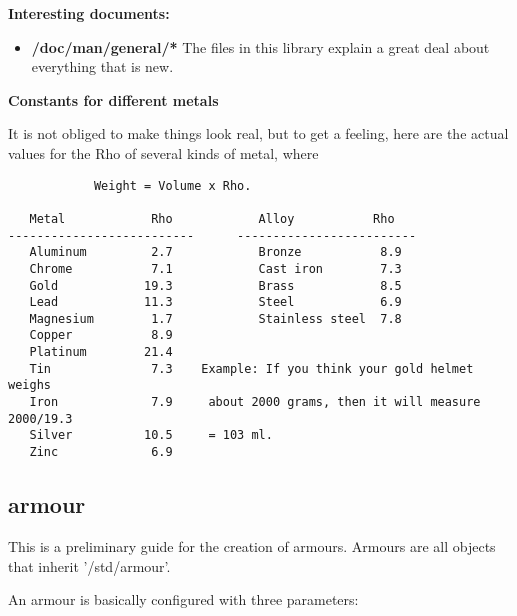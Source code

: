 {\bf Interesting documents:}

\begin{itemize}
\item{\bf /doc/man/general/*}
    The files in this library explain a great deal about
    everything that is new.
\end{itemize}

{\bf Constants for different metals}

It is not obliged to make things look real, but to get a feeling, here are
the actual values for the Rho of several kinds of metal, where

\begin{verbatim}
            Weight = Volume x Rho.

   Metal            Rho            Alloy           Rho
--------------------------      -------------------------
   Aluminum         2.7            Bronze           8.9
   Chrome           7.1            Cast iron        7.3
   Gold            19.3            Brass            8.5
   Lead            11.3            Steel            6.9
   Magnesium        1.7            Stainless steel  7.8
   Copper           8.9
   Platinum        21.4
   Tin              7.3    Example: If you think your gold helmet weighs
   Iron             7.9     about 2000 grams, then it will measure 2000/19.3
   Silver          10.5     = 103 ml.
   Zinc             6.9
\end{verbatim}


\subsection{armour}


This is a preliminary guide for the creation of armours. Armours are all
objects that inherit '/std/armour'.

An armour is basically configured with three parameters:

